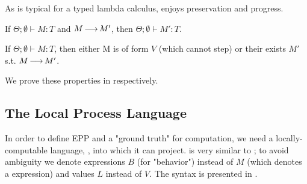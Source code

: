 As is typical for a typed lambda calculus, \HLSCentral enjoys preservation and progress.

\begin{theorem}[Preservation]\label{theorem:preservation}
  If $Θ;∅ ⊢ M : T$ and $M \operatorname{\longrightarrow} M'$, then $Θ;∅ ⊢ M' : T$.
\end{theorem}

\begin{theorem}[Progress]\label{theorem:progress}
  If $Θ;∅ ⊢ M : T$, then either M is of form $V$ (which cannot step)
  or their exists $M'$ s.t. $M \operatorname{\longrightarrow} M'$.
\end{theorem}

We prove these properties in  respectively.


\subsection{The Local Process Language}\label{sec:local-lang}

In order to define EPP and a "ground truth" for \HLSCentral computation,
we need a locally-computable language, \HLSLocal, into which it can project.
\HLSLocal is very similar to \HLSCentral;
to avoid ambiguity we denote \HLSLocal expressions $B$ (for "behavior")
instead of $M$ (which denotes a \HLSCentral expression)
and \HLSLocal values $L$ instead of $V$.
The syntax is presented in .


